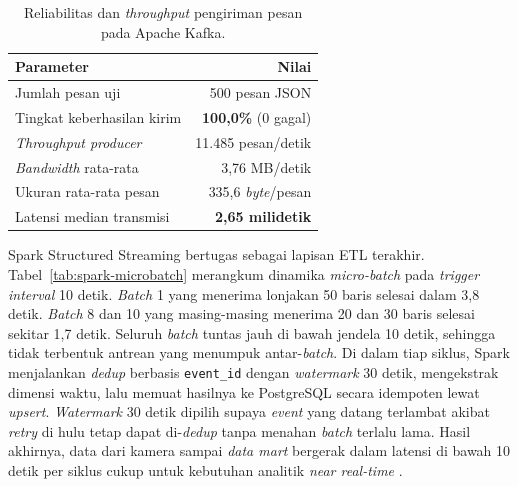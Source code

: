 \begin{table}[htbp]
\centering
\caption{Reliabilitas dan \textit{throughput} pengiriman pesan pada Apache Kafka.}
\label{tab:kafka-throughput}
\begin{tabular}{lr}
\toprule
\textbf{Parameter} & \textbf{Nilai} \\
\midrule
Jumlah pesan uji & 500 pesan JSON \\
Tingkat keberhasilan kirim & \textbf{100,0\%} (0 gagal) \\
\textit{Throughput producer} & 11.485 pesan/detik \\
\textit{Bandwidth} rata-rata & 3,76 MB/detik \\
Ukuran rata-rata pesan & 335,6 \textit{byte}/pesan \\
Latensi median transmisi & \textbf{2,65 milidetik} \\
\bottomrule
\end{tabular}
\end{table}

Spark Structured Streaming bertugas sebagai lapisan ETL terakhir. Tabel~\ref{tab:spark-microbatch} merangkum dinamika \textit{micro-batch} pada \textit{trigger interval} 10 detik. \textit{Batch} 1 yang menerima lonjakan 50 baris selesai dalam 3,8 detik. \textit{Batch} 8 dan 10 yang masing-masing menerima 20 dan 30 baris selesai sekitar 1,7 detik. Seluruh \textit{batch} tuntas jauh di bawah jendela 10 detik, sehingga tidak terbentuk antrean yang menumpuk antar-\textit{batch}. Di dalam tiap siklus, Spark menjalankan \textit{dedup} berbasis \texttt{event\_id} dengan \textit{watermark} 30 detik, mengekstrak dimensi waktu, lalu memuat hasilnya ke PostgreSQL secara idempoten lewat \textit{upsert}. \textit{Watermark} 30 detik dipilih supaya \textit{event} yang datang terlambat akibat \textit{retry} di hulu tetap dapat di-\textit{dedup} tanpa menahan \textit{batch} terlalu lama. Hasil akhirnya, data dari kamera sampai \textit{data mart} bergerak dalam latensi di bawah 10 detik per siklus  cukup untuk kebutuhan analitik \textit{near real-time} \cite{zaharia2018structured}.

